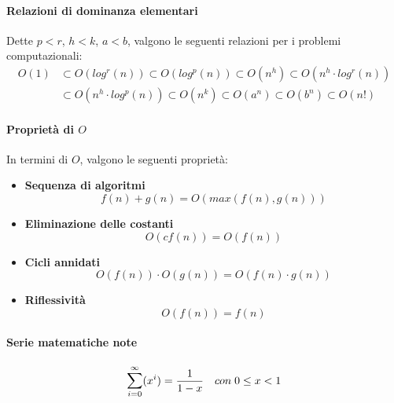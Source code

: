 \documentclass{article}
\begin{document}
\paragraph{Relazioni di dominanza elementari}
Dette $p < r$, $h < k$, $a < b$, valgono le seguenti relazioni per i problemi computazionali:
\begin{align*}
     O(1) &\subset O(log^r(n)) \subset O(log^p(n)) \subset O(n^h) \subset O(n^h \cdot log^r(n))\\ 
     &\subset O(n^h \cdot log^p(n)) \subset O(n^k) \subset O(a^n) \subset O(b^n) \subset O(n!)
\end{align*}

\paragraph{Proprietà di $O$}
In termini di $O$, valgono le seguenti proprietà:
\begin{itemize}
    \item \textbf{Sequenza di algoritmi}
    \begin{equation}
        f(n) + g(n) = O(max(f(n), g(n)))
        \label{eq:alg-seq}
    \end{equation}
    \item \textbf{Eliminazione delle costanti}
    \begin{equation}
        O(c f(n)) = O(f(n))
        \label{eq:const-elim}
    \end{equation}
    \item \textbf{Cicli annidati}
    \begin{equation}
        O(f(n)) \cdot O(g(n)) = O(f(n) \cdot g(n))
        \label{eq:nested-loops}
    \end{equation}

    \item \textbf{Riflessività}
    \begin{equation}
     O(f(n)) = f(n)
     \label{eq:reflex}
    \end{equation}
\end{itemize}

\paragraph{Serie matematiche note}
\begin{equation}
    \mathlarger{\sum}_{i=0}^{\infty}(x^i) = \frac{1}{1-x} \quad con\; 0\leq x<1
    \label{eq:geometric_sum}
\end{equation}
\end{document}
